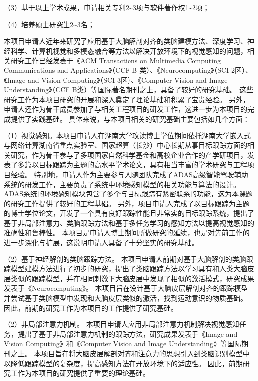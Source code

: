 \documentclass[a4paper,zihao=-4]{article}
\begin{document}
（3）基于以上学术成果，申请相关专利2\textasciitilde3项与软件著作权1\textasciitilde2项；

（4）培养硕士研究生2\textasciitilde3名；






本项目申请人近年来研究了应用基于大脑解剖对齐的类脑建模方法、深度学习、神经科学、计算机视觉和多模态融合等方法以解决开放环境下的视觉感知的问题，相关研究工作已经发表于《ACM Transactions on Multimedia Computing Communications and Applications》（CCF B 类）、《Neurocomputing》（SCI 2区）、《Image and Vision Computing》（SCI 3区）、《Computer Vision and Image Understanding》（CCF B类）等国际著名期刊之上，具备了较好的研究基础。
这些研究工作为本项目研究的开展和深入奠定了理论基础和积累了宝贵经验。
另外，申请人还作为骨干成员参加了与相关工程项目的研发工作，这进一步为本项目的完成提供了实践基础。
具体来说，与本项目相关的研究基础主要包括如几个方面：

（1）视觉感知。本项目申请人在湖南大学攻读博士学位期间依托湖南大学嵌入式与网络计算湖南省重点实验室、国家超算（长沙）中心长期从事目标跟踪方面的相关研究，作为骨干参与了多项国家自然科学基金和高校企业合作的产学研项目，发表了多篇以目标跟踪为主题的高水平学术论文，具有相当丰富的学术研究与工程项目经验。
特别地，申请人作为主要参与人随团队完成了ADAS高级智能驾驶辅助系统的研发工作，主要负责了系统中环境感知模型的相关功能与算法的设计。
ADAS系统的环境感知模块包含了多个与目标跟踪有紧密联系的功能，这为本课题的研究工作提供了较好的工程基础。
另外，项目申请人完成了以目标跟踪为主题的博士学位论文，开发了一个具有良好跟踪性能且非常实的目标跟踪系统，提出了基于非局部注意力、类脑跟踪方法和基于多任务学习的感知方法以提高视觉感知的准确性和鲁棒性。
本项目是申请人博士期间所做研究的延续，也是对先前工作的进一步深化与扩展，这说明申请人具备了十分坚实的研究基础。


（2）基于神经解剖的类脑跟踪方法。
本项目申请人前期对基于大脑解剖的类脑跟踪模型建模方法进行了初步的研究，提出了类脑跟踪方法以学习具有和人类大脑皮层类似的跟踪模型，并在相同刺激下大脑皮层中发现了相似的激活模式，研究成果发表于《Neurocomputing》。
本项目旨在设计基于大脑皮层解剖对齐的跟踪模型并尝试基于类脑模型中发现和大脑皮层类似的激活，找到运动意识的物质基础。
因此，前期的研究工作为本项目的工作提供了研究基础。


（2）非局部注意力机制。
本项目申请人应用非局部注意力机制解决视觉感知任务，提出了基于非局部注意力机制的跟踪方法，研究成果发表于《Image and Vision Computing》和《Computer
Vision and Image Understanding》等国际期刊之上。
本项目旨在将大脑皮层解剖对齐和注意力的思想引入到类脑识别模型中以降低跟踪模型的复杂度，提高感知方法在开放环境下的适应性。
因此，前期研究工作为本项目的研究提供了重要的理论基础。
\end{document}
